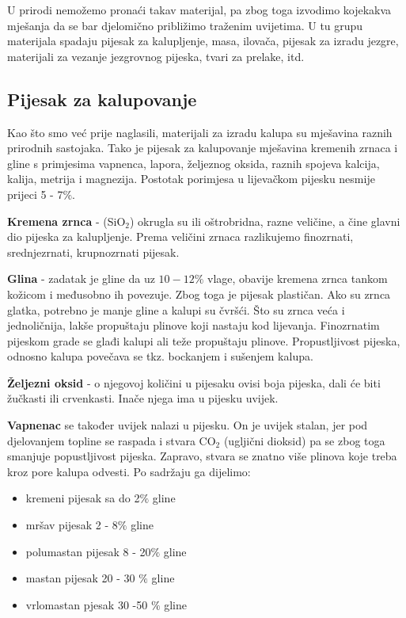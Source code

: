 \documentclass[a4paper,12pt]{article}
\numberwithin{figure}{section}
\begin{document}
U prirodi nemožemo pronaći takav materijal, pa zbog toga izvodimo kojekakva mješanja da se bar djelomično približimo traženim uvijetima. U tu grupu materijala spadaju pijesak za kalupljenje, masa, ilovača, pijesak za izradu jezgre, materijali za vezanje jezgrovnog pijeska, tvari za prelake, itd.
\subsection{Pijesak za kalupovanje}
Kao što smo već prije naglasili, materijali za izradu kalupa su mješavina raznih prirodnih sastojaka. Tako je pijesak za kalupovanje mješavina kremenih zrnaca i gline s primjesima vapnenca, lapora, željeznog oksida, raznih spojeva kalcija, kalija, metrija i magnezija. Postotak porimjesa u lijevačkom pijesku nesmije prijeci 5 - 7$\%$.\par
\textbf{Kremena zrnca} - (SiO$_{2}$) okrugla su ili oštrobridna, razne veličine, a čine glavni dio pijeska za kalupljenje. Prema veličini zrnaca razlikujemo finozrnati, srednjezrnati, krupnozrnati pijesak.\par
\textbf{Glina} - zadatak je gline da uz $10 - 12\%$ vlage, obavije kremena zrnca tankom kožicom i međusobno ih povezuje. Zbog toga je pijesak plastičan. Ako su zrnca glatka, potrebno je manje gline a kalupi su čvršći. Što su zrnca veća i jednoličnija, lakše propuštaju plinove koji nastaju kod lijevanja. Finozrnatim pijeskom grade se glađi kalupi ali teže propuštaju plinove. Propustljivost pijeska, odnosno kalupa povečava se tkz. bockanjem i sušenjem kalupa.\par
\textbf{Željezni oksid} - o njegovoj količini u pijesaku ovisi boja pijeska, dali će biti žučkasti ili crvenkasti. Inače njega ima u pijesku uvijek. \par 
\textbf{Vapnenac} se također uvijek nalazi u pijesku. On je uvijek stalan, jer pod djelovanjem topline se raspada i stvara CO$_{2}$ (ugljični dioksid) pa se zbog toga smanjuje popustljivost pijeska. Zapravo, stvara se znatno više plinova koje treba kroz pore kalupa odvesti. Po sadržaju ga dijelimo:
\begin{itemize}
\item kremeni pijesak sa do 2$\%$ gline
\item mršav pijesak 2 - 8$\%$ gline
\item polumastan pijesak 8 - 20$\%$ gline
\item mastan pijesak 20 - 30 $\%$ gline
\item vrlomastan pjesak 30 -50 $\%$ gline
\end{itemize}
\end{document}
